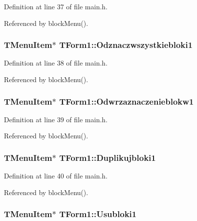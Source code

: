 Definition at line 37 of file main.h.

Referenced by blockMenu().\hypertarget{classTForm1_81af1788cb8fedfe45c5ab1e9d6fa84f}{
\subsubsection[Odznaczwszystkiebloki1]{\setlength{\rightskip}{0pt plus 5cm}TMenuItem$\ast$ {\bf TForm1::Odznaczwszystkiebloki1}}}
\label{classTForm1_81af1788cb8fedfe45c5ab1e9d6fa84f}




Definition at line 38 of file main.h.

Referenced by blockMenu().\hypertarget{classTForm1_55584a766db0eae448a1b827e95f9039}{
\subsubsection[Odwrzaznaczenieblokw1]{\setlength{\rightskip}{0pt plus 5cm}TMenuItem$\ast$ {\bf TForm1::Odwrzaznaczenieblokw1}}}
\label{classTForm1_55584a766db0eae448a1b827e95f9039}




Definition at line 39 of file main.h.

Referenced by blockMenu().\hypertarget{classTForm1_fca8fb962a23fccc15b91c8770882a85}{
\subsubsection[Duplikujbloki1]{\setlength{\rightskip}{0pt plus 5cm}TMenuItem$\ast$ {\bf TForm1::Duplikujbloki1}}}
\label{classTForm1_fca8fb962a23fccc15b91c8770882a85}




Definition at line 40 of file main.h.

Referenced by blockMenu().\hypertarget{classTForm1_67b6559358def61c012bd907a2994bdd}{
\subsubsection[Usubloki1]{\setlength{\rightskip}{0pt plus 5cm}TMenuItem$\ast$ {\bf TForm1::Usubloki1}}}
\label{classTForm1_67b6559358def61c012bd907a2994bdd}





